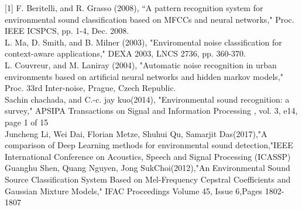 [1] F. Beritelli, and R. Grasso (2008), “A pattern recognition system for environmental sound classification based on MFCCs and neural networks," Proc. IEEE ICSPCS, pp.  1-4, Dec. 2008. \\
[2] L. Ma, D. Smith, and B. Milner (2003), "Enviromental
noise classification for context-aware applications,"
DEXA 2003, LNCS 2736, pp. 360-370. \\
[3] L. Couvreur, and M. Laniray (2004), "Automatic noise
recognition in urban environments based on artificial
neural networks and hidden markov models," Proc. 33rd
Inter-noise, Prague, Czech Republic. \\
[4]Sachin chachada, and C.-c. jay kuo(2014), "Environmental sound recognition: a survey," APSIPA Transactions on Signal and Information Processing , vol. 3, e14, page 1 of 15 \\
[5]Juncheng Li, Wei Dai, Florian Metze, Shuhui Qu, Samarjit Das(2017),"A comparison of Deep Learning methods for environmental sound detection,"IEEE International Conference on Acoustics, Speech and Signal Processing (ICASSP) \\
[6]Guanghu Shen, Quang Nguyen, Jong SukChoi(2012),"An Environmental Sound Source Classification System Based on Mel-Frequency Cepstral Coefficients and Gaussian Mixture Models," IFAC Proceedings Volume 45, Issue 6,Pages 1802-1807 \\
